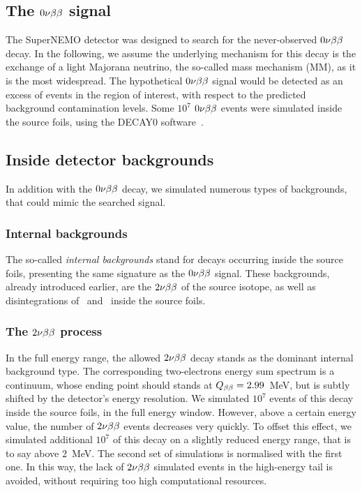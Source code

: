 
\subsection{The $0\nu\beta\beta$ signal}

The SuperNEMO detector was designed to search for the never-observed $0\nu\beta\beta$ decay.
In the following, we assume the underlying mechanism for this decay is the exchange of a light Majorana neutrino, the so-called mass mechanism (MM), as it is the most widespread.
The hypothetical $0\nu\beta\beta$ signal would be detected as an excess of events in the region of interest, with respect to the predicted background contamination levels.
Some $10^{7}$ $0\nu\beta\beta$ events were simulated inside the source foils, using the DECAY$0$ software~\cite{art:decay0}.

\subsection{Inside detector backgrounds}

In addition with the $0\nu\beta\beta$ decay, we simulated numerous types of backgrounds, that could mimic the searched signal.

\subsubsection{Internal backgrounds}

The so-called \emph{internal backgrounds} stand for decays occurring inside the source foils, presenting the same signature as the $0\nu\beta\beta$ signal.
These backgrounds, already introduced earlier, are the $2\nu\beta\beta$ of the source isotope, as well as disintegrations of \Tl\ and \Bi\ inside the source foils.

\subsubsection*{The $2\nu\beta\beta$ process}

In the full energy range, the allowed $2\nu\beta\beta$ decay stands as the dominant internal background type.
The corresponding two-electrons energy sum spectrum is a continuum, whose ending point should stands at $Q_{\beta\beta} = 2.99$~MeV, but is subtly shifted by the detector's energy resolution.
We simulated $10^{7}$ events of this decay inside the source foils, in the full energy window.
However, above a certain energy value, the number of $2\nu\beta\beta$ events decreases very quickly.
To offset this effect, we simulated additional $10^{7}$ of this decay on a slightly reduced energy range, that is to say above $2$~MeV.
The second set of simulations is normalised with the first one.
In this way, the lack of $2\nu\beta\beta$ simulated events in the high-energy tail is avoided, without requiring too high computational resources.

